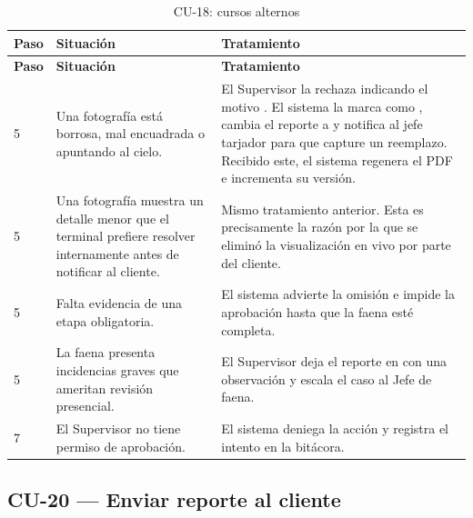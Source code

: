 {\estilotabla
\begin{longtable}{C{0.06\textwidth} L{0.38\textwidth} L{0.48\textwidth}}

\caption{CU-18: cursos alternos}
\label{tab:cu18_alt}
\\

\toprule
\textbf{Paso} & \textbf{Situación} & \textbf{Tratamiento} \\
\midrule
\endfirsthead

\toprule
\textbf{Paso} & \textbf{Situación} & \textbf{Tratamiento} \\
\midrule
\endhead

5 & Una fotografía está borrosa, mal encuadrada o apuntando al cielo. &
El Supervisor la rechaza indicando el motivo . El sistema la marca como
, cambia el reporte a  y notifica al jefe tarjador para
que capture un reemplazo. Recibido este, el sistema regenera el PDF e incrementa su versión. \\
\midrule

5 & Una fotografía muestra un detalle menor que el terminal prefiere resolver internamente antes de
notificar al cliente. &
Mismo tratamiento anterior. Esta es precisamente la razón por la que se eliminó la visualización en
vivo por parte del cliente. \\
\midrule

5 & Falta evidencia de una etapa obligatoria. &
El sistema advierte la omisión e impide la aprobación hasta que la faena esté completa. \\
\midrule

5 & La faena presenta incidencias graves que ameritan revisión presencial. &
El Supervisor deja el reporte en  con una observación y escala el caso al
Jefe de faena.  \\
\midrule

7 & El Supervisor no tiene permiso de aprobación. &
El sistema deniega la acción y registra el intento en la bitácora. \\

\bottomrule

\end{longtable}
}

\subsection{CU-20 --- Enviar reporte al cliente}
\label{subsec:cu20}

